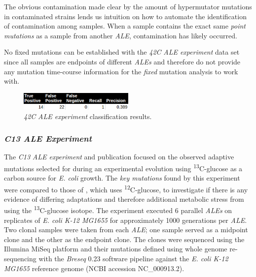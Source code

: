 \documentclass[12pt,final,masters,chapterheads]{ucsd}  %
\begin{document}
The obvious contamination made clear by the amount of hypermutator mutations in contaminated strains lends us intuition on how to automate the identification of contamination among samples. When a sample contains the exact same \textit{point mutations} as a sample from another \textit{ALE}, contamination has likely occurred.

No fixed mutations can be established with the \textit{42C} \textit{ALE experiment} data set since all samples are endpoints of different \textit{ALEs} and therefore do not provide any mutation time-course information for the \textit{fixed} mutation analysis to work with.
\begin{figure}[H]
  \centering
   \caption{\textit{42C} \textit{ALE experiment} classification results.}
  \includegraphics[width=0.5\textwidth]{42c_precision_recall.png}
\end{figure}
\subsubsection{\textit{C13} \textit{ALE Experiment}}
The \textit{C13} \textit{ALE experiment} and publication focused on the observed adaptive mutations selected for during an experimental evolution using \textsuperscript{13}C-glucose as a carbon source for \textit{E. coli} growth. The \textit{key mutations} found by this experiment were compared to those of \cite{pmid25304508}, which uses \textsuperscript{12}C-glucose, to investigate if there is any evidence of differing adaptations and therefore additional metabolic stress from using the \textsuperscript{13}C-glucose isotope. The experiment executed 6 parallel \textit{ALEs}  on replicates of \textit{E. coli K-12 MG1655} for approximately 1000 generations per \textit{ALE}. Two clonal samples were taken from each \textit{ALE}; one sample served as a midpoint clone and the other as the endpoint clone. The clones were sequenced using the Illumina MiSeq platform and their mutations defined using whole genome re-sequencing with the \textit{Breseq} 0.23 software pipeline against the \textit{E. coli K-12 MG1655} reference genome (NCBI accession NC\_000913.2).
\end{document}
